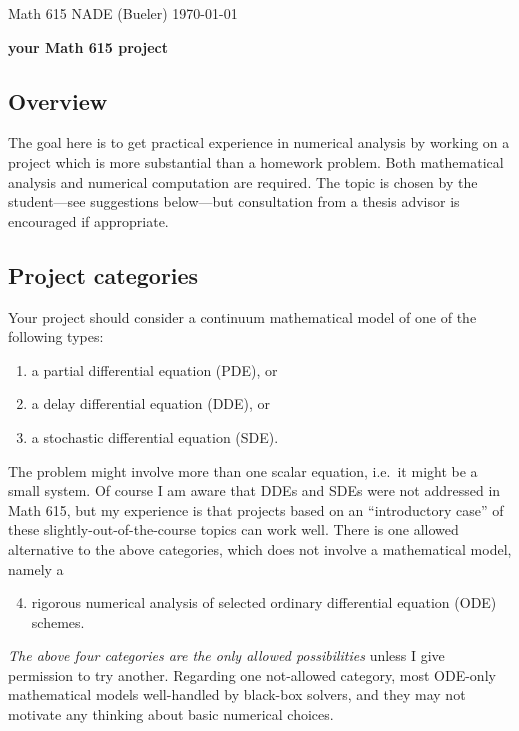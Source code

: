 \documentclass[11pt]{amsart}
\begin{document}
\scriptsize \noindent Math 615 NADE (Bueler) \hfill \today
\bigskip

\Large\centerline{\textbf{your Math 615 project}}
\normalsize

\thispagestyle{empty}

\bigskip

\subsection*{Overview}  The goal here is to get practical experience in numerical analysis by working on a project which is more substantial than a homework problem.  Both mathematical analysis and numerical computation are required.  The topic is chosen by the student---see suggestions below---but consultation from a thesis advisor is encouraged if appropriate.

\subsection*{Project categories}  Your project should consider a continuum mathematical model of one of the following types:
\renewcommand{\labelenumi}{\arabic{enumi}.}
\begin{enumerate}
\item a partial differential equation (PDE), or
\item a delay differential equation (DDE), or
\item a stochastic differential equation (SDE).
\end{enumerate}
The problem might involve more than one scalar equation, i.e.~it might be a small system.  Of course I am aware that DDEs and SDEs were not addressed in Math 615, but my experience is that projects based on an ``introductory case'' of these slightly-out-of-the-course topics can work well.  There is one allowed alternative to the above categories, which does not involve a mathematical model, namely a
\begin{enumerate}
\setcounter{enumi}{3}
\item rigorous numerical analysis of selected ordinary differential equation (ODE) schemes.
\end{enumerate}

\emph{The above four categories are the only allowed possibilities} unless I give permission to try another.  Regarding one not-allowed category, most ODE-only mathematical models well-handled by black-box solvers, and they may not motivate any thinking about basic numerical choices.
\end{document}
